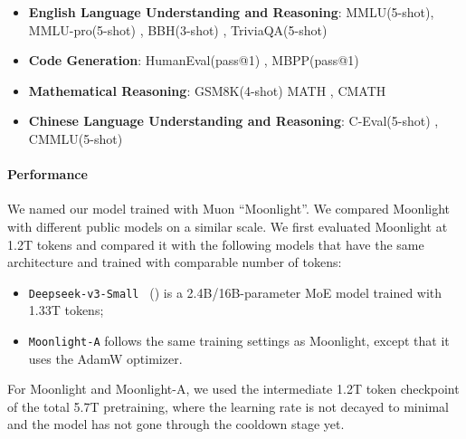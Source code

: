 \begin{itemize}
    \item \textbf{English Language Understanding and Reasoning}: MMLU(5-shot)\citep{hendrycks2021measuringmassivemultitasklanguage}, MMLU-pro(5-shot) \citep{wang2024mmluprorobustchallengingmultitask}, BBH(3-shot) \citep{suzgun2022challengingbigbenchtaskschainofthought}, TriviaQA(5-shot) \citep{joshi2017triviaqalargescaledistantly}

    \item \textbf{Code Generation}: HumanEval(pass@1) \citep{chen2021codex}, MBPP(pass@1)\citep{austin2021programsynthesislargelanguage}
    
    \item  \textbf{Mathematical Reasoning}: GSM8K(4-shot) \citep{cobbe2021trainingverifierssolvemath} MATH \citep{hendrycks2021measuringmathematicalproblemsolving}, CMATH \citep{wei2023cmathlanguagemodelpass}

    \item \textbf{Chinese Language Understanding and Reasoning}: C-Eval(5-shot) \citep{huang2023cevalmultilevelmultidisciplinechinese}, CMMLU(5-shot)\citep{li2024cmmlumeasuringmassivemultitask}
\end{itemize}


\paragraph{Performance} We named our model trained with Muon ``Moonlight''. We compared Moonlight with different public models on a similar scale. We first evaluated Moonlight at 1.2T tokens and compared it with the following models that have the same architecture and trained with comparable number of tokens:

\begin{itemize}    
    \item \texttt{Deepseek-v3-Small } (\cite{deepseekai2024deepseekv3technicalreport}) is a  2.4B/16B-parameter MoE model trained with 1.33T tokens;
    \item \texttt{Moonlight-A} follows the same training settings as Moonlight, except that it uses the AdamW optimizer.
\end{itemize}

 For Moonlight and Moonlight-A, we used the intermediate 1.2T token checkpoint of the total 5.7T pretraining, where the learning rate is not decayed to minimal and the model has not gone through the cooldown stage yet.

